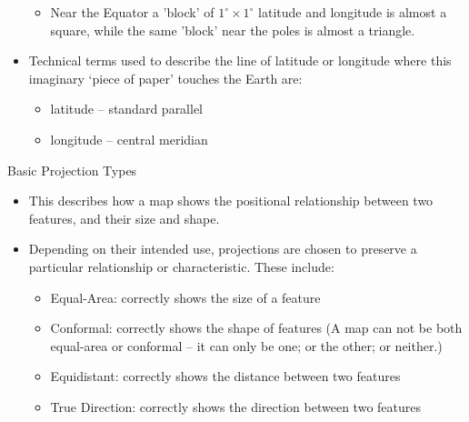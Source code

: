 \documentclass[11pt,dvipsnames,ignorenonframetext,aspectratio=169]{beamer}
\providecommand{\tightlist}{%
  \setlength{\itemsep}{0pt}\setlength{\parskip}{0pt}}
\begin{document}
\begin{frame}{}
\begin{itemize}
  \begin{itemize}
  \footnotesize
  \item Near the Equator a 'block' of $1^\circ \times 1^\circ$ latitude and longitude is almost a square, while the same 'block' near the poles is almost a triangle.
  \end{itemize}
\item
  Technical terms used to describe the line of latitude or longitude
  where this imaginary `piece of paper' touches the Earth are:

  \begin{itemize}
  \footnotesize
  \item latitude – standard parallel
  \item longitude – central meridian
  \end{itemize}
\end{itemize}
\end{frame}

\begin{frame}{Basic Projection Types}
\protect\hypertarget{basic-projection-types}{}
\begin{itemize}
\tightlist
\item
  This describes how a map shows the positional relationship between two
  features, and their size and shape.
\item
  Depending on their intended use, projections are chosen to preserve a
  particular relationship or characteristic. These include:

  \begin{itemize}
  \tightlist
  \item
    Equal-Area: correctly shows the size of a feature
  \item
    Conformal: correctly shows the shape of features (A map can not be
    both equal-area or conformal -- it can only be one; or the other; or
    neither.)
  \item
    Equidistant: correctly shows the distance between two features
  \item
    True Direction: correctly shows the direction between two features
  \end{itemize}
\end{itemize}
\end{frame}
\end{document}
